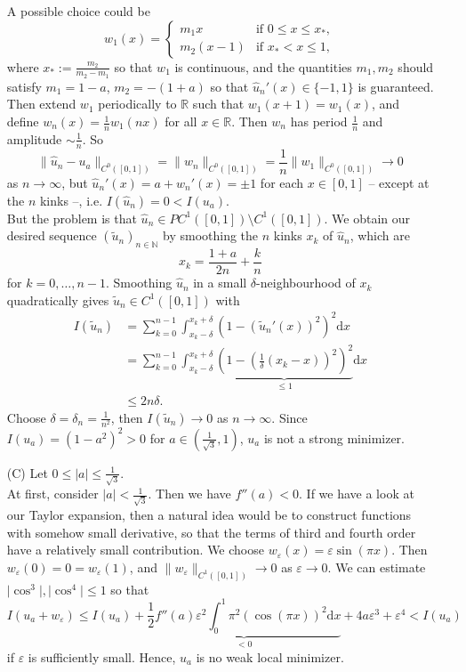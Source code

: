 \begin{itemize}
	A possible choice could be
	\[w_1(x)=\left\{\begin{array}{rl}
		m_1x&\text{if }0\leq x\leq x_*,\\
		m_2(x-1)&\text{if }x_*<x\leq 1,
	\end{array}\right.\]
	where $x_*:=\frac{m_2}{m_2-m_1}$ so that $w_1$ is continuous, and the quantities $m_1,m_2$ should satisfy $m_1=1-a$, $m_2=-(1+a)$ so that $\hat{u}_n'(x)\in\{-1,1\}$ is guaranteed. Then extend $w_1$ periodically to $\mathbb{R}$ such that $w_1(x+1)=w_1(x)$, and define $w_n(x)=\frac{1}{n}w_1(nx)$ for all $x\in\mathbb{R}$. Then $w_n$ has period $\frac{1}{n}$ and amplitude $\sim\frac{1}{n}$. So
	\[\lVert\hat{u}_n-u_a\rVert_{C^0([0,1])}=\lVert w_n\rVert_{C^0([0,1])}=\frac{1}{n}\lVert w_1\rVert_{C^0([0,1])}\to0\]
	as $n\to\infty$, but $\hat{u}_n'(x)=a+w_n'(x)=\pm1$ for each $x\in[0,1]$ -- except at the $n$ kinks --, i.e. $I(\hat{u}_n)=0<I(u_a)$.\\

	But the problem is that $\hat{u}_n\in PC^1([0,1])\setminus C^1([0,1])$. We obtain our desired sequence $(\widetilde{u}_n)_{n\in\mathbb{N}}$ by smoothing the $n$ kinks $x_k$ of $\hat{u}_n$, which are
	\[x_k=\frac{1+a}{2n}+\frac{k}{n}\]
	for $k=0,\dotsc,n-1$. Smoothing $\hat{u}_n$ in a small $\delta$-neighbourhood of $x_k$ quadratically gives $\widetilde{u}_n\in C^1([0,1])$ with
	\begin{align*}
		I(\widetilde{u}_n)&=\sum_{k=0}^{n-1}{\int_{x_k-\delta}^{x_k+\delta}{(1-(\widetilde{u}_n'(x))^2)^2\mathrm{d}x}}\\
		&=\sum_{k=0}^{n-1}{\int_{x_k-\delta}^{x_k+\delta}{\underbrace{\left(1-\left(\frac{1}{\delta}(x_k-x)\right)^2\right)^2}_{\leq1}\mathrm{d}x}}\\
		&\leq 2n\delta.
	\end{align*}
	Choose $\delta=\delta_n=\frac{1}{n^2}$, then $I(\widetilde{u}_n)\to0$ as $n\to\infty$. Since $I(u_a)=(1-a^2)^2>0$ for $a\in(\frac{1}{\sqrt{3}},1)$, $u_a$ is not a strong minimizer.
	\item[(C)] Let $0\leq\lvert a\rvert\leq\frac{1}{\sqrt{3}}$.\\

	At first, consider $\lvert a\rvert<\frac{1}{\sqrt{3}}$. Then we have $f''(a)<0$. If we have a look at our Taylor expansion, then a natural idea would be to construct functions with somehow small derivative, so that the terms of third and fourth order have a relatively small contribution. We choose $w_\varepsilon(x)=\varepsilon\sin(\pi x)$. Then $w_\varepsilon(0)=0=w_\varepsilon(1)$, and $\lVert w_\varepsilon\rVert_{C^1([0,1])}\to0$ as $\varepsilon\to0$. We can estimate $\lvert\cos^3\rvert,\lvert\cos^4\rvert\leq1$ so that
	\[I(u_a+w_\varepsilon)\leq I(u_a)+\underbrace{\frac{1}{2}f''(a)\varepsilon^2\int_0^1{\pi^2(\cos(\pi x))^2\mathrm{d}x}}_{<0}+4a\varepsilon^3+\varepsilon^4<I(u_a)\]
	if $\varepsilon$ is sufficiently small. Hence, $u_a$ is no weak local minimizer.\\


\end{itemize}
